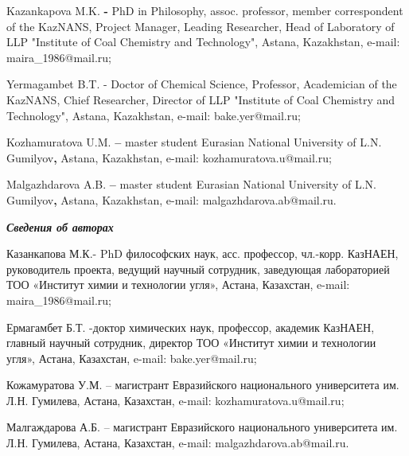 \begin{noparindent}
Kazankapova M.K. {\bfseries -} PhD in Philosophy, assoc. professor, member
correspondent of the KazNANS, Project Manager, Leading Researcher, Head
of Laboratory of LLP "Institute of Coal Chemistry and Technology",
Astana, Kazakhstan, e-mail: maira\_1986@mail.ru;

Yermagambet B.T. - Doctor of Chemical Science, Professor, Academician of
the KazNANS, Chief Researcher, Director of LLP "Institute of Coal
Chemistry and Technology", Astana, Kazakhstan, e-mail: bake.yer@mail.ru;

Kozhamuratova U.M. {\bfseries --} master student Eurasian National
University of L.N. Gumilyov{\bfseries ,} Astana, Kazakhstan, e-mail:
kozhamuratova.u@mail.ru;

Malgazhdarova A.B. {\bfseries --} master student Eurasian National
University of L.N. Gumilyov{\bfseries ,} Astana, Kazakhstan, e-mail:
malgazhdarova.ab@mail.ru.
\end{noparindent}

\emph{{\bfseries Сведения об авторах}}

\begin{noparindent}
Казанкапова М.К.- PhD философских наук, асс. профессор, чл.-корр.
КазНАЕН, руководитель проекта, ведущий научный сотрудник, заведующая
лабораторией ТОО «Институт химии и технологии угля», Астана, Казахстан,
e-mail: maira\_1986@mail.ru;

Ермагамбет Б.Т. -доктор химических наук, профессор, академик КазНАЕН,
главный научный сотрудник, директор ТОО «Институт химии и технологии
угля», Астана, Казахстан, e-mail: bake.yer@mail.ru;

Кожамуратова У.М. -- магистрант Евразийского национального университета
им. Л.Н. Гумилева, Астана, Казахстан, e-mail: kozhamuratova.u@mail.ru;

Малгаждарова А.Б. -- магистрант Евразийского национального университета
им. Л.Н. Гумилева, Астана, Казахстан, e-mail: malgazhdarova.ab@mail.ru.
\end{noparindent}
